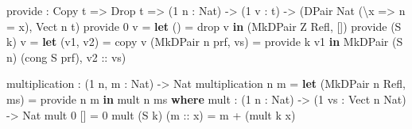 \documentclass[
]{article}
\newenvironment{Shaded}{}{}
\newcommand{\DataTypeTok}[1]{\textcolor[rgb]{0.56,0.13,0.00}{#1}}
\newcommand{\DecValTok}[1]{\textcolor[rgb]{0.25,0.63,0.44}{#1}}
\newcommand{\FunctionTok}[1]{\textcolor[rgb]{0.02,0.16,0.49}{#1}}
\newcommand{\KeywordTok}[1]{\textcolor[rgb]{0.00,0.44,0.13}{\textbf{#1}}}
\newcommand{\NormalTok}[1]{#1}
\newcommand{\OperatorTok}[1]{\textcolor[rgb]{0.40,0.40,0.40}{#1}}
\newcommand{\OtherTok}[1]{\textcolor[rgb]{0.00,0.44,0.13}{#1}}
\begin{document}
\begin{Shaded}
\begin{Highlighting}[]
\NormalTok{provide }\OperatorTok{:} \DataTypeTok{Copy}\NormalTok{ t }\OtherTok{=\textgreater{}} \DataTypeTok{Drop}\NormalTok{ t }\OtherTok{=\textgreater{}}\NormalTok{ (}\DecValTok{1}\NormalTok{ n }\OperatorTok{:} \DataTypeTok{Nat}\NormalTok{) }\OtherTok{{-}\textgreater{}}\NormalTok{ (}\DecValTok{1}\NormalTok{ v }\OperatorTok{:}\NormalTok{ t) }\OtherTok{{-}\textgreater{}}\NormalTok{ (}\DataTypeTok{DPair} \DataTypeTok{Nat}\NormalTok{ (\textbackslash{}x }\OtherTok{=\textgreater{}}\NormalTok{ n }\OtherTok{=}\NormalTok{ x), }\DataTypeTok{Vect}\NormalTok{ n t)}
\NormalTok{provide }\DecValTok{0}\NormalTok{ v }\OtherTok{=} \KeywordTok{let}\NormalTok{ () }\OtherTok{=} \FunctionTok{drop}\NormalTok{ v }\KeywordTok{in}\NormalTok{ (}\DataTypeTok{MkDPair} \DataTypeTok{Z} \DataTypeTok{Refl}\NormalTok{, [])}
\NormalTok{provide (}\DataTypeTok{S}\NormalTok{ k) v }\OtherTok{=} \KeywordTok{let}\NormalTok{ (v1, v2) }\OtherTok{=}\NormalTok{ copy v}
\NormalTok{                      (}\DataTypeTok{MkDPair}\NormalTok{ n prf, vs) }\OtherTok{=}\NormalTok{ provide k v1 }\KeywordTok{in} \DataTypeTok{MkDPair}\NormalTok{ (}\DataTypeTok{S}\NormalTok{ n) (cong }\DataTypeTok{S}\NormalTok{ prf),}\OtherTok{ v2 ::}\NormalTok{ vs)}

\NormalTok{multiplication }\OperatorTok{:}\NormalTok{ (}\DecValTok{1}\NormalTok{ n, m }\OperatorTok{:} \DataTypeTok{Nat}\NormalTok{) }\OtherTok{{-}\textgreater{}} \DataTypeTok{Nat}
\NormalTok{multiplication n m }\OtherTok{=} \KeywordTok{let}\NormalTok{ (}\DataTypeTok{MkDPair}\NormalTok{ n\textquotesingle{} }\DataTypeTok{Refl}\NormalTok{, ms) }\OtherTok{=}\NormalTok{ provide n m }\KeywordTok{in}\NormalTok{ mult n\textquotesingle{} ms}
  \KeywordTok{where}
\NormalTok{    mult }\OperatorTok{:}\NormalTok{ (}\DecValTok{1}\NormalTok{ n }\OperatorTok{:} \DataTypeTok{Nat}\NormalTok{) }\OtherTok{{-}\textgreater{}}\NormalTok{ (}\DecValTok{1}\NormalTok{ vs }\OperatorTok{:} \DataTypeTok{Vect}\NormalTok{ n }\DataTypeTok{Nat}\NormalTok{) }\OtherTok{{-}\textgreater{}} \DataTypeTok{Nat}
\NormalTok{    mult }\DecValTok{0}\NormalTok{ [] }\OtherTok{=} \DecValTok{0}
\NormalTok{    mult (}\DataTypeTok{S}\NormalTok{ k) (}\OtherTok{m ::}\NormalTok{ x) }\OtherTok{=}\NormalTok{ m }\OperatorTok{+}\NormalTok{ (mult k x)}
\end{Highlighting}
\end{Shaded}
\end{document}
